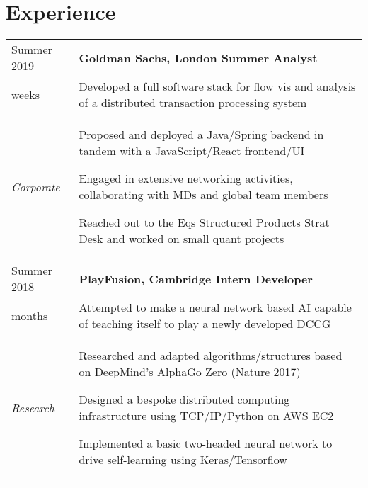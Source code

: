 \documentclass[letterpaper, 10pt]{article}
\begin{document}
\vspace{-0.5\baselineskip}

\section*{Experience}
\begin{tabularx}{\linewidth}{>{\raggedleft}p{2.2cm}|X}
Summer 2019 & \textbf{Goldman Sachs, London \hfill Summer Analyst}\\
10 weeks & Developed a full software stack for flow vis and analysis of a distributed transaction processing system\\
\textit{Corporate} &
\vspace{-.5\baselineskip}
\begin{compact}
	\item Proposed and deployed a Java/Spring backend in tandem with a JavaScript/React frontend/UI
	\item Engaged in extensive networking activities, collaborating with MDs and global team members
	\item Reached out to the Eqs Structured Products Strat Desk and worked on small quant projects
	\vspace{-.5\baselineskip}
\end{compact}\\
Summer 2018 & \textbf{PlayFusion, Cambridge \hfill Intern Developer}\\
3 months & Attempted to make a neural network based AI capable of teaching itself to play a newly developed DCCG\\
\textit{Research} &
\vspace{-.5\baselineskip}
\begin{compact}
	\item Researched and adapted algorithms/structures based on DeepMind's AlphaGo Zero (Nature 2017)
	\item Designed a bespoke distributed computing infrastructure using TCP/IP/Python on AWS EC2
	\item Implemented a basic two-headed neural network to drive self-learning using Keras/Tensorflow

\end{compact}
\end{tabularx}
\end{document}
